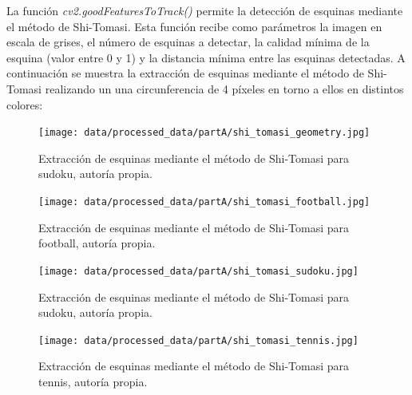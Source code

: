 \documentclass[a4paper,12pt]{article}
\begin{document}
{La función \textit{cv2.goodFeaturesToTrack()} permite la detección de esquinas mediante el método de Shi-Tomasi. Esta función recibe como parámetros la imagen en escala de grises,
el número de esquinas a detectar, la calidad mínima de la esquina (valor entre 0 y 1) y la distancia mínima entre las esquinas detectadas. A continuación se muestra la extracción 
de esquinas mediante el método de Shi-Tomasi realizando un una circunferencia de 4 píxeles en torno a ellos en distintos colores:

\vspace{0.5cm}

\begin{figure}[h!]
    \centering
    \begin{minipage}[b]{0.35\textwidth}
        \centering
        \texttt{[image: data/processed\_data/partA/shi\_tomasi\_geometry.jpg]}
        \caption{Extracción de esquinas mediante el método de Shi-Tomasi para sudoku, autoría propia.}
        \label{fig:shi-tomasi-geometry}
    \end{minipage}
    \hfill
    \begin{minipage}[b]{0.45\textwidth}
        \centering
        \texttt{[image: data/processed\_data/partA/shi\_tomasi\_football.jpg]}
        \caption{Extracción de esquinas mediante el método de Shi-Tomasi para football, autoría propia.}
        \label{fig:shi-tomasi-football}
    \end{minipage}

\end{figure}

\newpage

\begin{figure}[h!]
    \centering
    \begin{minipage}[b]{0.35\textwidth}
        \centering
        \texttt{[image: data/processed\_data/partA/shi\_tomasi\_sudoku.jpg]}
        \caption{Extracción de esquinas mediante el método de Shi-Tomasi para sudoku, autoría propia.}
        \label{fig:shi-tomasi-sudoku}
    \end{minipage}
    \hfill
    \begin{minipage}[b]{0.45\textwidth}
        \centering
        \texttt{[image: data/processed\_data/partA/shi\_tomasi\_tennis.jpg]}
        \caption{Extracción de esquinas mediante el método de Shi-Tomasi para tennis, autoría propia.}
        \label{fig:shi-tomasi-tennis}
    \end{minipage}

\end{figure}

}
\end{document}
